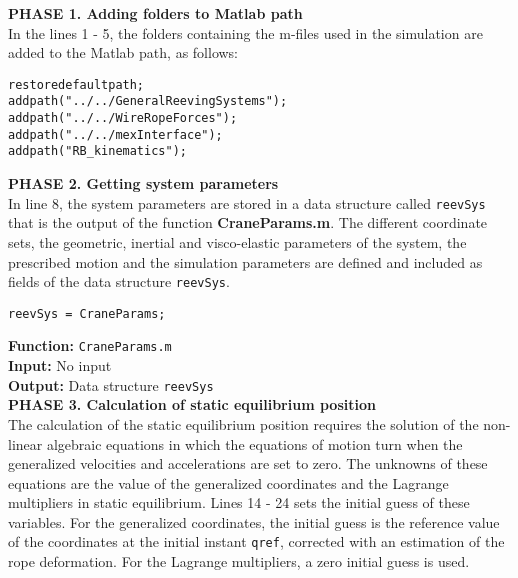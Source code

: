 \textbf{PHASE 1. Adding folders to Matlab path} \\

In the lines 1 - 5, the folders containing the m-files used in the simulation are added to the Matlab path, as follows:

{\begin{tcolorbox}\begin{lstlisting}[style=Matlab-editor]
restoredefaultpath;
addpath("../../GeneralReevingSystems");
addpath("../../WireRopeForces");
addpath("../../mexInterface");
addpath("RB_kinematics");
\end{lstlisting}\end{tcolorbox}}
 

\textbf{PHASE 2. Getting system parameters} \\

In line 8, the system parameters are stored in a data structure called \texttt{reevSys} that is the output of the function \textbf{CraneParams.m}. The different coordinate sets, the geometric, inertial and visco-elastic parameters of the system, the prescribed motion and the simulation parameters are defined and included as fields of the data structure \texttt{reevSys}. 

{\begin{tcolorbox}\begin{lstlisting}[style=Matlab-editor]
% Getting system parameters %
reevSys = CraneParams;
\end{lstlisting}\end{tcolorbox}}


\setlength{\parindent}{0cm}
\textbf{Function:} \texttt{CraneParams.m} \\
\textbf{Input:} No input \\
\textbf{Output:} Data structure \texttt{reevSys} \\

\textbf{PHASE 3. Calculation of static equilibrium position} \\

The calculation of the static equilibrium position requires the solution of the non-linear algebraic equations in which the equations of motion turn when the generalized velocities and accelerations are set to zero. The unknowns of these equations are the value of the generalized coordinates and the Lagrange multipliers in static equilibrium. Lines 14 - 24 sets the initial guess of these variables. For the generalized coordinates, the initial guess is the reference value of the coordinates at the initial instant \texttt{qref}, corrected with an estimation of the rope deformation. For the Lagrange multipliers, a zero initial guess is used.

